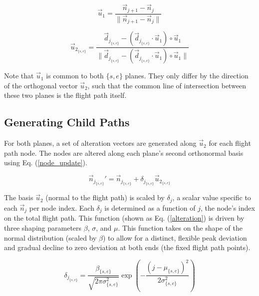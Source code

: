 \documentclass[conf]{new-aiaa}
\begin{document}
\begin{equation}
\label{normal-basis1}
\vec{u}_1 = \frac{\vec{n}_{j + 1} - \vec{n}_j}{\|\vec{n}_{j + 1} - \vec{n}_j\|}
\end{equation}

\begin{equation}
\label{normal-basis2}
\vec{u}_{2_{\{s, e\}}} = \frac{\vec{d}_{j_{\{s, e\}}} - \left(\vec{d}_{j_{\{s, e\}}}{\cdot}\vec{u}_1\right){\circ}\vec{u}_1}{\|\vec{d}_{j_{\{s, e\}}} - \left(\vec{d}_{j_{\{s, e\}}}{\cdot}\vec{u}_1\right){\circ}\vec{u}_1\|}
\end{equation}

Note that $\vec{u}_1$ is common to both $\{s, e\}$ planes. They only differ by the direction of the orthogonal vector $\vec{u}_2$, such that the common line of intersection between these two planes is the flight path itself.


\subsection{Generating Child Paths}

For both planes, a set of alteration vectors are generated along $\vec{u}_2$ for each flight path node. The nodes are altered along each plane's second orthonormal basis using Eq. (\ref{node_update}).

\begin{equation}
\label{node_update}
\vec{n}_{j_{{\{s, e\}}}}' = \vec{n}_{j_{\{s, e\}}} + \delta_{j_{\{s, e\}}}\vec{u}_{2_{\{s, e\}}}
\end{equation}

The basis $\vec{u}_2$ (normal to the flight path) is scaled by $\delta_j$, a scalar value specific to each $\vec{n}_j$ per node index. Each $\delta_j$ is determined as a function of $j$, the node's index on the total flight path. This function (shown as Eq. (\ref{alteration}) is driven by three shaping parameters $\beta$, $\sigma$, and $\mu$. This function takes on the shape of the normal distribution (scaled by $\beta$) to allow for a distinct, flexible peak deviation and gradual decline to zero deviation at both ends (the fixed flight path points).

\begin{equation}
\label{alteration}
\delta_{j_{\{s, e\}}} = \frac{\beta_{\{s, e\}}}{\sqrt{2\pi\sigma_{\{s, e\}}^2}}\exp\left({-\frac{{\left(j - \mu_{\{s, e\}}\right)}^2}{2\sigma_{\{s, e\}}^2}}\right)
\end{equation}
\end{document}
